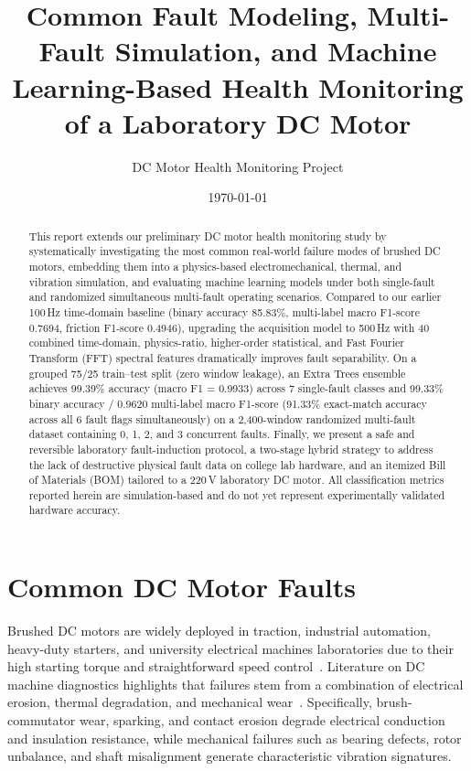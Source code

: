 \documentclass[11pt,a4paper]{article}
\title{\textbf{Common Fault Modeling, Multi-Fault Simulation, and Machine Learning-Based Health Monitoring of a Laboratory DC Motor}}
\author{DC Motor Health Monitoring Project}
\date{\today}
\begin{document}
\maketitle

\begin{abstract}
This report extends our preliminary DC motor health monitoring study by systematically investigating the most common real-world failure modes of brushed DC motors, embedding them into a physics-based electromechanical, thermal, and vibration simulation, and evaluating machine learning models under both single-fault and randomized simultaneous multi-fault operating scenarios. Compared to our earlier 100\,Hz time-domain baseline (binary accuracy 85.83\%, multi-label macro F1-score 0.7694, friction F1-score 0.4946), upgrading the acquisition model to 500\,Hz with 40 combined time-domain, physics-ratio, higher-order statistical, and Fast Fourier Transform (FFT) spectral features dramatically improves fault separability. On a grouped 75/25 train--test split (zero window leakage), an Extra Trees ensemble achieves 99.39\% accuracy (macro F1 = 0.9933) across 7 single-fault classes and 99.33\% binary accuracy / 0.9620 multi-label macro F1-score (91.33\% exact-match accuracy across all 6 fault flags simultaneously) on a 2,400-window randomized multi-fault dataset containing 0, 1, 2, and 3 concurrent faults. Finally, we present a safe and reversible laboratory fault-induction protocol, a two-stage hybrid strategy to address the lack of destructive physical fault data on college lab hardware, and an itemized Bill of Materials (BOM) tailored to a 220\,V laboratory DC motor. All classification metrics reported herein are simulation-based and do not yet represent experimentally validated hardware accuracy.
\end{abstract}

\tableofcontents
\newpage

\section{Common DC Motor Faults}

Brushed DC motors are widely deployed in traction, industrial automation, heavy-duty starters, and university electrical machines laboratories due to their high starting torque and straightforward speed control~\cite{yousefnejad2025,chougule2026}. Literature on DC machine diagnostics highlights that failures stem from a combination of electrical erosion, thermal degradation, and mechanical wear~\cite{yousefnejad2025}. Specifically, brush-commutator wear, sparking, and contact erosion degrade electrical conduction and insulation resistance, while mechanical failures such as bearing defects, rotor unbalance, and shaft misalignment generate characteristic vibration signatures.
\end{document}
